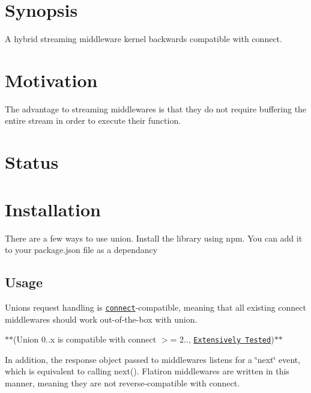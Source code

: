 

\section*{Synopsis}

A hybrid streaming middleware kernel backwards compatible with connect.

\section*{Motivation}

The advantage to streaming middlewares is that they do not require buffering the entire stream in order to execute their function.

\section*{Status}

\href{http://travis-ci.org/flatiron/union}{\tt }

\section*{Installation}

There are a few ways to use {\ttfamily union}. Install the library using npm. You can add it to your {\ttfamily package.\+json} file as a dependancy




\subsection*{Usage}

Union\textquotesingle{}s request handling is \href{https://github.com/senchalabs/connect}{\tt connect}-\/compatible, meaning that all existing connect middlewares should work out-\/of-\/the-\/box with union.

$\ast$$\ast$(Union 0..\+x is compatible with connect $>$= 2.., \href{https://github.com/pksunkara/connect-union}{\tt Extensively Tested})$\ast$$\ast$

In addition, the response object passed to middlewares listens for a \char`\"{}next\char`\"{} event, which is equivalent to calling {\ttfamily next()}. Flatiron middlewares are written in this manner, meaning they are not reverse-\/compatible with connect.

